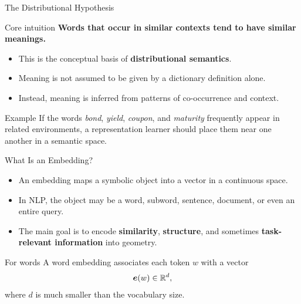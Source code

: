 \documentclass[11pt,aspectratio=169,professionalfonts]{beamer}
\begin{document}
%
%
\begin{frame}{The Distributional Hypothesis}
\begin{block}{Core intuition}
\textbf{Words that occur in similar contexts tend to have similar meanings.}
\end{block}

\vspace{0.15cm}
\begin{itemize}
    \item This is the conceptual basis of \textbf{distributional semantics}.
    \item Meaning is not assumed to be given by a dictionary definition alone.
    \item Instead, meaning is inferred from patterns of co-occurrence and context.
\end{itemize}

\vspace{0.15cm}
\begin{exampleblock}{Example}
If the words \textit{bond}, \textit{yield}, \textit{coupon}, and \textit{maturity} frequently appear in related environments, a representation learner should place them near one another in a semantic space.
\end{exampleblock}
\end{frame}
%
%
\begin{frame}{What Is an Embedding?}
\begin{itemize}
    \item An embedding maps a symbolic object into a vector in a continuous space.
    \item In NLP, the object may be a word, subword, sentence, document, or even an entire query.
    \item The main goal is to encode \textbf{similarity}, \textbf{structure}, and sometimes \textbf{task-relevant information} into geometry.
\end{itemize}

\vspace{0.2cm}
\begin{block}{For words}
A word embedding associates each token $w$ with a vector
\[
\bm{e}(w) \in \mathbb{R}^{d},
\]
where $d$ is much smaller than the vocabulary size.
\end{block}
\end{frame}
%
%
\end{document}
